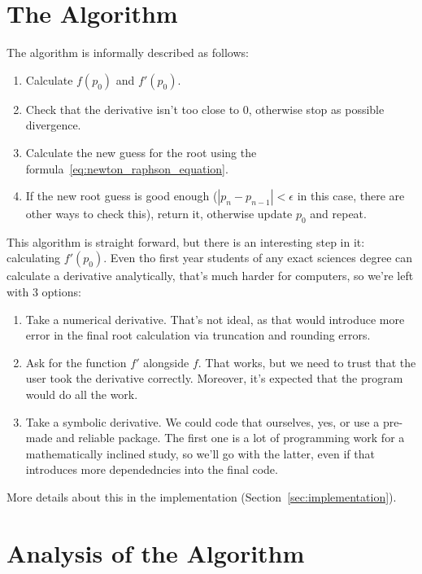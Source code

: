 \documentclass[12pt]{article}
\theoremstyle{remark}
\begin{document}
\section{The Algorithm}\label{sec:algorithm}

The algorithm is informally described as follows:
\begin{enumerate}\label{alg:newton_alg}
        \item Calculate $f(p_0)$ and $f'(p_0)$.
        \item Check that the derivative isn't too close to $0$, otherwise stop as possible divergence.
        \item Calculate the new guess for the root using the formula~\eqref{eq:newton_raphson_equation}.
        \item If the new root guess is good enough ($|p_n - p_{n - 1}| < \epsilon$ in this case, there are other ways to check this), return it, otherwise update $p_0$ and repeat.
\end{enumerate}

This algorithm is straight forward, but there is an interesting step in it: calculating $f'(p_0)$. Even tho first year students of any exact sciences degree can calculate a derivative analytically, that's much harder for computers, so we're left with 3 options:
\begin{enumerate}
        \item Take a numerical derivative. That's not ideal, as that would introduce more error in the final root calculation via truncation and rounding errors.
  \item Ask for the function $f'$ alongside $f$. That works, but we need to trust that the user took the derivative correctly. Moreover, it's expected that the program would do all the work.
        \item Take a symbolic derivative. We could code that ourselves, yes, or use a pre-made and reliable package. The first one is a lot of programming work for a mathematically inclined study, so we'll go with the latter, even if that introduces more dependedncies into the final code.
\end{enumerate}

More details about this in the implementation (Section~\ref{sec:implementation}).

\section{Analysis of the Algorithm}\label{sec:analysis}
\end{document}
